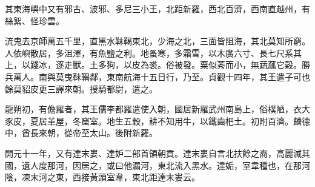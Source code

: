 \begin{pinyinscope}
 其東海嶼中又有邪古、波邪、多尼三小王，北距新羅，西北百濟，西南直越州，有絲絮、怪珍雲。



 流鬼去京師萬五千里，直黑水靺鞨東北，少海之北，三面皆阻海，其北莫知所窮。人依嶼散居，多沮澤，有魚鹽之利。地蚤寒，多霜雪，以木廣六寸、長七尺系其上，以踐冰，逐走獸。土多狗，以皮為裘。俗被發。粟似莠而小，無蔬蓏它穀。勝兵萬人。南與莫曳靺鞨鄰，東南航海十五日行，乃至。貞觀十四年，其王遣子可也餘莫貂皮更三譯來朝。授騎都尉，遣之。



 龍朔初，有儋羅者，其王儒李都羅遣使入朝，國居新羅武州南島上，俗樸陋，衣大豕皮，夏居革屋，冬窟室。地生五穀，耕不知用牛，以鐵齒杷土。初附百濟。麟德中，酋長來朝，從帝至太山。後附新羅。



 開元十一年，又有達末婁、達妒二部首領朝貢。達末婁自言北扶餘之裔，高麗滅其國，遺人度那河，因居之，或曰他漏河，東北流入黑水。達姤，室韋種也，在那河陰，凍末河之東，西接黃頭室韋，東北距達末婁云。



\end{pinyinscope}